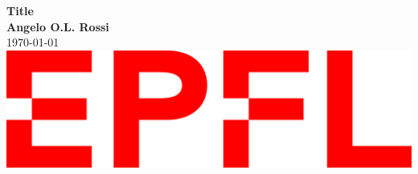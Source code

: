 \documentclass{article}
\begin{document}
	\begin{titlepage}
		\centering
		\hspace{0pt}
		\vfill
		\textbf{\LARGE{Title}}\\
		\vspace{1cm}
		\textbf{\large{Angelo O.L. Rossi}}\\
		\today\\
		\vspace{5cm}
		\includegraphics[width=0.2\linewidth]{figures/epfl.png}
		\vfill
	\end{titlepage}
	\restoregeometry
	
	\tableofcontents
	\setcounter{page}{3}
	
	
	
\end{document}
